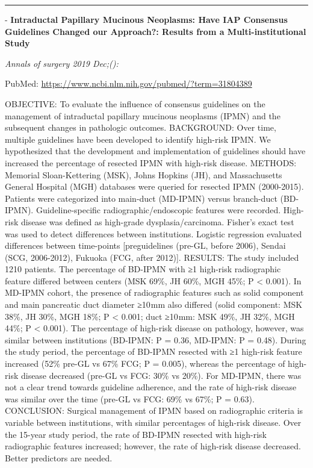 \documentclass[
]{article}
\renewcommand{\linethickness}{0.05em}
\begin{document}
\begin{center}\rule{0.5\linewidth}{\linethickness}\end{center}

- \textbf{Intraductal Papillary Mucinous Neoplasms: Have IAP Consensus
Guidelines Changed our Approach?: Results from a Multi-institutional
Study}

\emph{Annals of surgery 2019 Dec;():}

PubMed: \url{https://www.ncbi.nlm.nih.gov/pubmed/?term=31804389}

OBJECTIVE: To evaluate the influence of consensus guidelines on the
management of intraductal papillary mucinous neoplasms (IPMN) and the
subsequent changes in pathologic outcomes. BACKGROUND: Over time,
multiple guidelines have been developed to identify high-risk IPMN. We
hypothesized that the development and implementation of guidelines
should have increased the percentage of resected IPMN with high-risk
disease. METHODS: Memorial Sloan-Kettering (MSK), Johns Hopkins (JH),
and Massachusetts General Hospital (MGH) databases were queried for
resected IPMN (2000-2015). Patients were categorized into main-duct
(MD-IPMN) versus branch-duct (BD-IPMN). Guideline-specific
radiographic/endoscopic features were recorded. High-risk disease was
defined as high-grade dysplasia/carcinoma. Fisher's exact test was used
to detect differences between institutions. Logistic regression
evaluated differences between time-points {[}preguidelines (pre-GL,
before 2006), Sendai (SCG, 2006-2012), Fukuoka (FCG, after 2012){]}.
RESULTS: The study included 1210 patients. The percentage of BD-IPMN
with ≥1 high-risk radiographic feature differed between centers (MSK
69\%, JH 60\%, MGH 45\%; P \textless{} 0.001). In MD-IPMN cohort, the
presence of radiographic features such as solid component and main
pancreatic duct diameter ≥10 mm also differed (solid component: MSK
38\%, JH 30\%, MGH 18\%; P \textless{} 0.001; duct ≥10 mm: MSK 49\%, JH
32\%, MGH 44\%; P \textless{} 0.001). The percentage of high-risk
disease on pathology, however, was similar between institutions
(BD-IPMN: P = 0.36, MD-IPMN: P = 0.48). During the study period, the
percentage of BD-IPMN resected with ≥1 high-risk feature increased (52\%
pre-GL vs 67\% FCG; P = 0.005), whereas the percentage of high-risk
disease decreased (pre-GL vs FCG: 30\% vs 20\%). For MD-IPMN, there was
not a clear trend towards guideline adherence, and the rate of high-risk
disease was similar over the time (pre-GL vs FCG: 69\% vs 67\%; P =
0.63). CONCLUSION: Surgical management of IPMN based on radiographic
criteria is variable between institutions, with similar percentages of
high-risk disease. Over the 15-year study period, the rate of BD-IPMN
resected with high-risk radiographic features increased; however, the
rate of high-risk disease decreased. Better predictors are needed.
\end{document}
